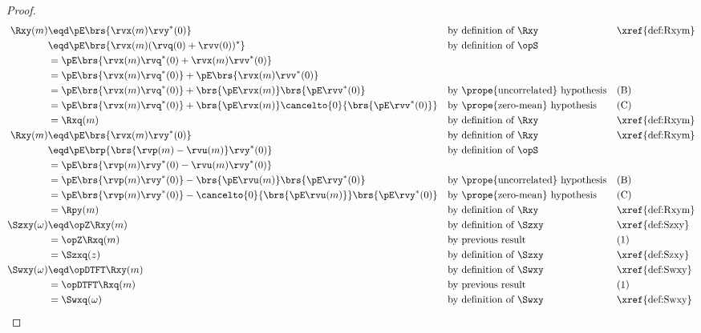 \begin{proof}
\begin{align*}
  \Rxy(m)
    &\eqd \pE\brs{\rvx(m)\rvy^\ast(0)}
    && \text{by definition of $\Rxy$}
    && \text{\xref{def:Rxym}}
  \\&\eqd \pE\brs{\rvx(m)(\rvq(0)+\rvv(0))^\ast}
    && \text{by definition of $\opS$}
  \\&= \pE\brs{\rvx(m)\rvq^\ast(0)+\rvx(m)\rvv^\ast(0)}
  \\&= \pE\brs{\rvx(m)\rvq^\ast(0)} + \pE\brs{\rvx(m)\rvv^\ast(0)}
  \\&= \pE\brs{\rvx(m)\rvq^\ast(0)} + \brs{\pE\rvx(m)}\brs{\pE\rvv^\ast(0)}
    && \text{by \prope{uncorrelated} hypothesis}
    && \text{(B)}
  \\&= \pE\brs{\rvx(m)\rvq^\ast(0)} + \brs{\pE\rvx(m)}\cancelto{0}{\brs{\pE\rvv^\ast(0)}}
    && \text{by \prope{zero-mean} hypothesis}
    && \text{(C)}
  \\&= \Rxq(m)
    && \text{by definition of $\Rxy$}
    && \text{\xref{def:Rxym}}
  \\
  \Rxy(m)
    &\eqd \pE\brs{\rvx(m)\rvy^\ast(0)}
    && \text{by definition of $\Rxy$}
    && \text{\xref{def:Rxym}}
  \\&\eqd \pE\brp{\brs{\rvp(m)-\rvu(m)}\rvy^\ast(0)}
    && \text{by definition of $\opS$}
  \\&= \pE\brs{\rvp(m)\rvy^\ast(0)-\rvu(m)\rvy^\ast(0)}
  \\&= \pE\brs{\rvp(m)\rvy^\ast(0)} - \brs{\pE\rvu(m)}\brs{\pE\rvy^\ast(0)}
    && \text{by \prope{uncorrelated} hypothesis}
    && \text{(B)}
  \\&= \pE\brs{\rvp(m)\rvy^\ast(0)} - \cancelto{0}{\brs{\pE\rvu(m)}}\brs{\pE\rvy^\ast(0)}
    && \text{by \prope{zero-mean} hypothesis}
    && \text{(C)}
  \\&= \Rpy(m)
    && \text{by definition of $\Rxy$}
    && \text{\xref{def:Rxym}}
  \\
  \Szxy(\omega)
    &\eqd \opZ\Rxy(m)
    && \text{by definition of $\Szxy$}
    && \text{\xref{def:Szxy}}
  \\&= \opZ\Rxq(m)
    && \text{by previous result}
    && \text{(1)}
  \\&= \Szxq(z)
    && \text{by definition of $\Szxy$}
    && \text{\xref{def:Szxy}}
  \\
  \Swxy(\omega)
    &\eqd \opDTFT\Rxy(m)
    && \text{by definition of $\Swxy$}
    && \text{\xref{def:Swxy}}
  \\&= \opDTFT\Rxq(m)
    && \text{by previous result}
    && \text{(1)}
  \\&= \Swxq(\omega)
    && \text{by definition of $\Swxy$}
    && \text{\xref{def:Swxy}}
\end{align*}
\end{proof}

